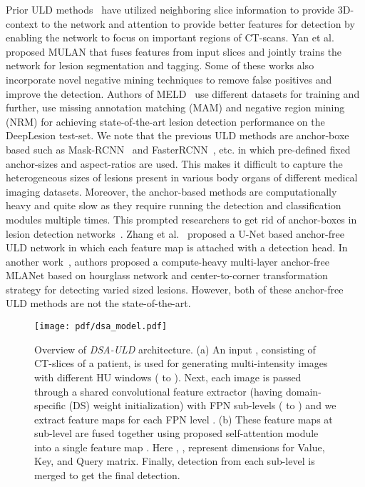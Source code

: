 \documentclass{article}
\begin{document}
\vspace{-1mm}
Prior ULD methods~\cite{3dce, yan2019mulan, li2019mvp, retinanet_improv} have utilized neighboring slice information to provide 3D-context to the network and attention to provide better features for detection by enabling the network to focus on important regions of CT-scans. Yan et al.~\cite{yan2019mulan} proposed MULAN that fuses features from  input slices and jointly trains the network for lesion segmentation and tagging. Some of these works also incorporate novel negative mining techniques to remove false positives and improve the detection. Authors of MELD~\cite{meld} use  different datasets for training and further, use missing annotation matching (MAM) and negative region mining (NRM) for achieving state-of-the-art lesion detection performance on the DeepLesion test-set. We note that the previous ULD methods are anchor-boxe based such as Mask-RCNN~\cite{he2017mask} and FasterRCNN~\cite{ren2015faster}, etc. in which pre-defined fixed anchor-sizes and aspect-ratios are used. This makes it difficult to capture the heterogeneous sizes of lesions present in various body organs of different medical imaging datasets.
Moreover, the anchor-based methods are computationally heavy and quite slow as they require running the detection and classification modules multiple times. This prompted researchers to get rid of anchor-boxes in lesion detection networks~\cite{mla-net, anchorfree-rpn}. Zhang et al.~\cite{anchorfree-rpn} proposed a U-Net based anchor-free ULD network in which each feature map is attached with a detection head. In another work~\cite{mla-net}, authors proposed a compute-heavy multi-layer anchor-free MLANet based on hourglass network and center-to-corner transformation strategy for detecting varied sized lesions. However, both of these anchor-free ULD methods are not the state-of-the-art. 

\begin{figure*}[t]
  \centering
  \texttt{[image: pdf/dsa\_model.pdf]}
  \caption{\small{Overview of \emph{DSA-ULD} architecture. (a) An input , consisting of  CT-slices of a patient, is used for generating  multi-intensity images  with  different HU windows ( to ). Next, each image is passed through a shared convolutional feature extractor (having domain-specific (DS) weight initialization) with  FPN sub-levels ( to ) and we extract  feature maps  for each FPN level . (b) These feature maps at sub-level  are fused together using proposed self-attention module into a single feature map . Here , ,  represent dimensions for Value, Key, and Query matrix. Finally, detection from each sub-level is merged to get the final detection. 
  }}
  \label{fig:arch-dia}
  \vspace{-3mm}
\end{figure*}
\vspace{-1mm}
\end{document}

